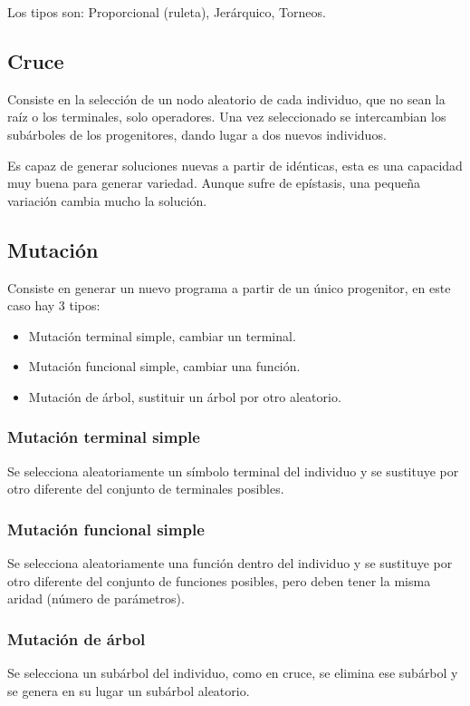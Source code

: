 \documentclass[12pt, twoside, openright]{report} %
\begin{document}
Los tipos son: Proporcional (ruleta), Jerárquico, Torneos.

\subsection{Cruce}
Consiste en la selección de un nodo aleatorio de cada individuo, que no sean la raíz o los terminales, solo operadores. Una vez seleccionado se intercambian los subárboles de los progenitores, dando lugar a dos nuevos individuos.

Es capaz de generar soluciones nuevas a partir de idénticas, esta es una capacidad muy buena para generar variedad. Aunque sufre de epístasis, una pequeña variación cambia mucho la solución.
\pagebreak

\subsection{Mutación}
Consiste en generar un nuevo programa a partir de un único progenitor, en este caso hay 3 tipos:
\begin{itemize}
	\item Mutación terminal simple, cambiar un terminal.
	\item Mutación funcional simple, cambiar una función.
	\item Mutación de árbol, sustituir un árbol por otro aleatorio.
\end{itemize}

\subsubsection{Mutación terminal simple}
Se selecciona aleatoriamente un símbolo terminal del individuo y se  sustituye por otro diferente del conjunto de terminales posibles.

\subsubsection{Mutación funcional simple}
Se selecciona aleatoriamente una función dentro del individuo y se sustituye por otro diferente del conjunto de funciones posibles, pero deben tener la misma aridad (número de parámetros).

\subsubsection{Mutación de árbol}
Se selecciona un subárbol del individuo, como en cruce, se elimina ese subárbol y se genera en su lugar un subárbol aleatorio.
\end{document}
